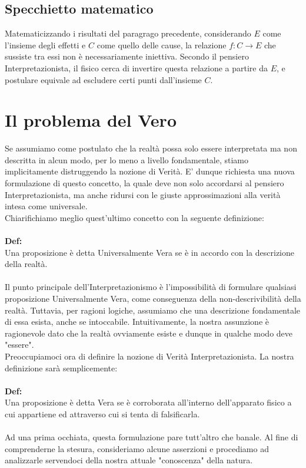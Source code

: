\documentclass[]{scrbook}
\begin{document}
	\subsection{Specchietto matematico}
	Matematicizzando i risultati del paragrago precedente, considerando $E$ come l'insieme degli effetti e $C$ come quello delle cause, la relazione $f:C\rightarrow E$ che sussiste tra essi non è necessariamente iniettiva. Secondo il pensiero Interpretazionista, il fisico cerca di invertire questa relazione a partire da $E$, e postulare equivale ad escludere certi punti dall'insieme $C$.
	\section{Il problema del Vero}
	Se assumiamo come postulato che la realtà possa solo essere interpretata ma non descritta in alcun modo, per lo meno a livello fondamentale, stiamo implicitamente distruggendo la nozione di Verità. E' dunque richiesta  una nuova formulazione di questo concetto, la quale deve non solo accordarsi al pensiero Interpretazionista, ma anche ridursi con le giuste approssimazioni alla verità intesa come universale.\\
	Chiarifichiamo meglio quest'ultimo concetto con la seguente definizione:\\
	\\
	\textbf{Def:}\\
	Una proposizione è detta Universalmente Vera se è in accordo con la descrizione della realtà.\\
	\\
	Il punto principale dell'Interpretazionismo è l'impossibilità di formulare qualsiasi proposizione Universalmente Vera, come conseguenza della non-descrivibilità della realtà. Tuttavia, per ragioni logiche, assumiamo che una descrizione fondamentale di essa esista, anche se intoccabile. Intuitivamente, la nostra assunzione è ragionevole dato che la realtà ovviamente esiste e dunque in qualche modo deve "essere". \\
	Preoccupiamoci ora di definire la nozione di Verità Interpretazionista. La nostra definizione sarà semplicemente:\\
	\\
	\textbf{Def:}\\
	Una proposizione è detta Vera se è corroborata all'interno dell'apparato fisico a cui appartiene ed attraverso cui si tenta di falsificarla.\\
	\\
	Ad una prima occhiata, questa formulazione pare tutt'altro che banale. Al fine di comprenderne la stesura, consideriamo alcune asserzioni e procediamo ad analizzarle servendoci della nostra attuale "conoscenza" della natura.\\
\end{document}
